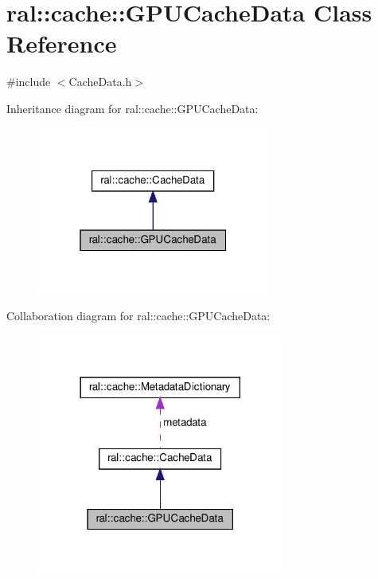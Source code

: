 \hypertarget{classral_1_1cache_1_1GPUCacheData}{}\section{ral\+:\+:cache\+:\+:G\+P\+U\+Cache\+Data Class Reference}
\label{classral_1_1cache_1_1GPUCacheData}


{\ttfamily \#include $<$Cache\+Data.\+h$>$}



Inheritance diagram for ral\+:\+:cache\+:\+:G\+P\+U\+Cache\+Data\+:\nopagebreak
\begin{figure}[H]
\begin{center}
\leavevmode
\includegraphics[width=217pt]{classral_1_1cache_1_1GPUCacheData__inherit__graph}
\end{center}
\end{figure}


Collaboration diagram for ral\+:\+:cache\+:\+:G\+P\+U\+Cache\+Data\+:\nopagebreak
\begin{figure}[H]
\begin{center}
\leavevmode
\includegraphics[width=230pt]{classral_1_1cache_1_1GPUCacheData__coll__graph}
\end{center}
\end{figure}
